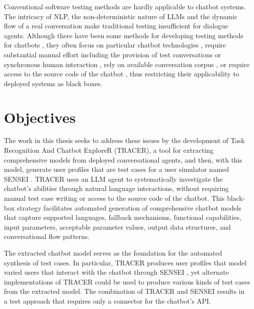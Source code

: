 Conventional software testing methods \autocite{ammannIntroductionSoftwareTesting2017}
are hardly applicable to chatbot systems.
The intricacy of \ac{NLP}, the non-deterministic nature of \acp{LLM} and the dynamic flow of a real conversation make traditional testing insufficient for dialogue agents.
Although there have been some methods for developing testing methods for chatbots \cite{cuadradoIntegratingStaticQuality2024, canizaresMeasuringClusteringHeterogeneous2024}, they often focus on particular chatbot technologies \autocite{RasaTest2025}, require substantial manual effort including the provision of test conversations \autocite{CyaraBotium, RasaTest2025} or synchronous human interaction \autocite{renEvaluationTechniquesChatbot2019}, rely on available conversation corpus \autocite{vasconcelosBottesterTestingConversational2017}, or require access to the source code of the chatbot \autocite{canizaresCoveragebasedStrategiesAutomated2024, gomez-abajoMutationTestingTaskOriented2024, urricoMutaBotMutationTesting2024}, thus restricting their applicability to deployed systems as black boxes.

\section{Objectives}

The work in this thesis seeks to address these issues by the development of Task Recognition And Chatbot ExploreR (\ac{TRACER}), a tool for extracting comprehensive models from deployed conversational agents, and then, with this model, generate user profiles that are test cases for a user simulator named SENSEI \autocite{delaraAutomatedEndtoEndTesting2025, delaraSensei}.
\ac{TRACER} uses an \ac{LLM} agent to systematically investigate the chatbot's abilities through natural language interactions, without requiring manual test case writing or access to the source code of the chatbot.
This black-box strategy facilitates automated generation of comprehensive chatbot models that capture supported languages, fallback mechanisms, functional capabilities, input parameters, acceptable parameter values, output data structures, and conversational flow patterns.


The extracted chatbot model serves as the foundation for the automated synthesis of test cases.
In particular, \ac{TRACER} produces user profiles that model varied users that interact with the chatbot through SENSEI \autocite{delaraAutomatedEndtoEndTesting2025, delaraSensei}, yet alternate implementations of \ac{TRACER} could be used to produce various kinds of test cases from the extracted model.
The combination of \ac{TRACER} and SENSEI results in a test approach that requires only a connector for the chatbot’s API.

